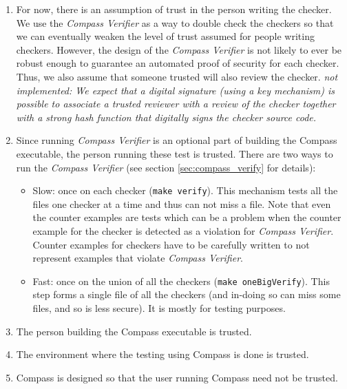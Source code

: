 \begin{enumerate}
   \item For now, there is an assumption of trust in the person writing the checker. \\
      We use the \emph{Compass Verifier} as a way to double check the 
      checkers so that we can eventually weaken the level of trust assumed for people 
      writing checkers. However, the design of the \emph{Compass Verifier} is not likely to
      ever be robust enough to guarantee an automated proof of security for each checker.  
      Thus, we also assume that someone trusted will also review the checker.
      {\em not implemented: We expect that a digital signature (using a key mechanism) 
           is possible to associate a trusted reviewer with a review of 
           the checker together with a strong hash function that
           digitally signs the checker source code.}

   \item Since running \emph{Compass Verifier} is an optional part of building 
      the Compass executable, the person running these test is trusted. There are
      two ways to run the \emph{Compass Verifier} (see section \ref{sec:compass_verify}
    for details):
      \begin{itemize}
         \item Slow: once on each checker ({\tt make verify}). This mechanism
            tests all the files one checker at a time and thus can not miss 
            a file.  Note that even the counter examples are tests which can 
            be a problem when the counter example for the checker is detected
            as a violation for \emph{Compass Verifier}.  Counter examples for
            checkers have to be carefully written to not represent examples that
            violate \emph{Compass Verifier}.
         \item Fast: once on the union of all the checkers ({\tt make oneBigVerify}).
            This step forms a single file of all the checkers (and in-doing so can
            miss some files, and so is less secure).  It is mostly for testing 
            purposes.
      \end{itemize}

   \item The person building the Compass executable is trusted.

   \item The environment where the testing using Compass is done is trusted.

   \item Compass is designed so that the user running Compass need not be trusted.

\end{enumerate}

